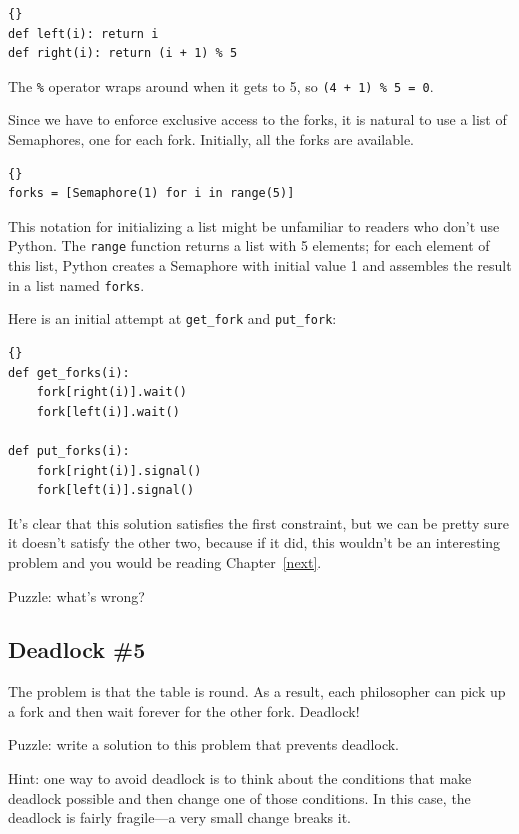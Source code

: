 \documentclass{book}
\begin{document}
\begin{lstlisting}[title={Which fork?}]{}
def left(i): return i
def right(i): return (i + 1) % 5
\end{lstlisting}

The {\tt \%} operator wraps around when it gets to 5, so
    {\tt (4 + 1) \% 5 = 0}.

Since we have to enforce exclusive access to the forks,
it is natural to use a list of Semaphores, one for
each fork.  Initially, all the forks are available.

\begin{lstlisting}[title={Variables for dining philosophers}]{}
forks = [Semaphore(1) for i in range(5)]
\end{lstlisting}

This notation for initializing a list might be unfamiliar to
readers who don't use Python.  The {\tt range} function returns
a list with 5 elements; for each element of this list, Python
creates a Semaphore with initial value 1 and assembles the
result in a list named {\tt forks}.

Here is an initial attempt at {\tt get\_fork} and {\tt put\_fork}:

\begin{lstlisting}[title={Dining philosophers non-solution}]{}
def get_forks(i):
    fork[right(i)].wait()
    fork[left(i)].wait()

def put_forks(i):
    fork[right(i)].signal()
    fork[left(i)].signal()
\end{lstlisting}

It's clear that this solution satisfies the first constraint, but
we can be pretty sure it doesn't satisfy the other two, because
if it did, this wouldn't be an interesting problem and you would
be reading Chapter~\ref{next}.

Puzzle: what's wrong?



\subsection{Deadlock \#5}

The problem is that the table is round.  As a result, each philosopher
can pick up a fork and then wait forever for the other fork.  Deadlock!

Puzzle: write a solution to this problem that prevents deadlock.

Hint: one way to avoid deadlock is to think about the conditions
that make deadlock possible and then change one of those conditions.
In this case, the deadlock is fairly fragile---a very small change
breaks it.
\end{document}
